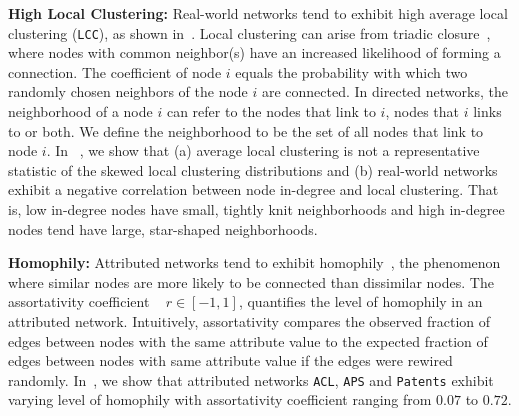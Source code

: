 \textbf{High Local Clustering:}
Real-world networks tend to exhibit high average local clustering
(\texttt{LCC}), as shown in~. Local
clustering can arise from triadic closure~\cite{simmel1950sociology,
newman2001clustering}, where nodes with common neighbor(s) have an increased
likelihood of forming a connection.
The coefficient of node $i$ equals the probability with which two randomly chosen
neighbors of the node $i$ are connected. In directed networks, the neighborhood
of a node $i$ can refer to the nodes that link to $i$, nodes that
$i$ links to or both. We define the neighborhood to be the set
of all nodes that link to node $i$. In ~, we show that (a) average local clustering is not a
representative statistic of the skewed local clustering distributions and (b) real-world networks
exhibit a negative correlation between node in-degree and local clustering.
That is, low in-degree nodes have small, tightly knit neighborhoods
and high in-degree nodes tend have large, star-shaped neighborhoods.


\textbf{Homophily:}
Attributed networks tend to exhibit homophily~\cite{mcpherson2001birds}, the
phenomenon where similar nodes are more likely to be connected than dissimilar
nodes. The assortativity coefficient ~\cite{newman2002assortative} $r \in [-1,
1]$, quantifies the level of homophily in an attributed network.
Intuitively,
assortativity compares the observed fraction of edges between nodes with the same attribute
value to the expected fraction of edges between nodes with same attribute value
if the edges were rewired randomly. In~, we show that
attributed networks \texttt{ACL}, \texttt{APS} and \texttt{Patents} exhibit
varying level of homophily with assortativity coefficient ranging from $0.07$ to
$0.72$.

